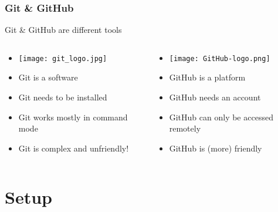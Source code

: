 \documentclass[xcolor=x11names,compress]{beamer}
\renewcommand{\(}{\begin{columns}}
\renewcommand{\)}{\end{columns}}
\newcommand{\<}[1]{\begin{column}{#1}}
\renewcommand{\>}{\end{column}}
\begin{document}
\begin{frame}
\frametitle{Git  \& GitHub}
\begin{center}
    Git \& GitHub are different tools
\end{center}
\begin{columns}[t]
 \begin{column}{0.5\textwidth}
 \begin{itemize}[<+->]
  \item[]{\begin{center}
              \texttt{[image: git\_logo.jpg]} \\
             \end{center} }
        \item Git is a software
        \item Git needs to be installed
        \item Git works mostly in command mode
        \item Git is complex and unfriendly!

    \end{itemize}
 \end{column}
 \begin{column}{0.5\textwidth}
 \begin{itemize}[<+->]
  \item[]{\begin{center}
              \texttt{[image: GitHub-logo.png]} \\
             \end{center} }
        \item GitHub is a platform
        \item GitHub needs an account
        \item GitHub can only be accessed remotely
        \item GitHub is (more) friendly
    \end{itemize}
 \end{column}
\end{columns}
\end{frame}


\section{Setup}
\end{document}
